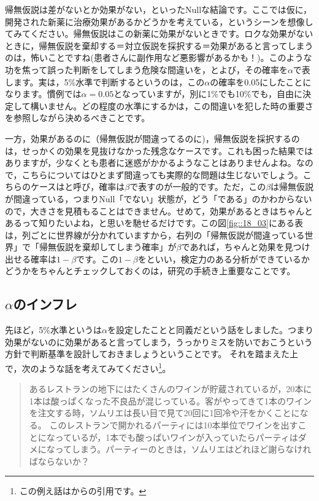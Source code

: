 \documentclass{ltjsarticle}
\begin{document}
帰無仮説は差がないとか効果がない，といったNullな結論です。ここでは仮に，開発された新薬に治療効果があるかどうかを考えている，というシーンを想像してみてください。帰無仮説はこの新薬に効果がないときです。ロクな効果がないときに，帰無仮説を棄却する＝対立仮説を採択する＝効果があると言ってしまうのは，怖いことですね(患者さんに副作用など悪影響があるかも！)。このような功を焦って誤った判断をしてしまう危険な間違いを，とよび，その確率を$\alpha$で表します。実は，5\%水準で判断するというのは，この$\alpha$の確率を0.05にしたことになります。慣例では$\alpha=0.05$となっていますが，別に1\%でも10\%でも，自由に決定して構いません。どの程度の水準にするかは，この間違いを犯した時の重要さを参照しながら決めるべきことです。

一方，効果があるのに（帰無仮説が間違ってるのに)，帰無仮説を採択するのは，せっかくの効果を見抜けなかった残念なケースです。これも困った結果ではありますが，少なくとも患者に迷惑がかかるようなことはありませんよね。なので，こちらについてはひとまず間違っても実際的な問題は生じないでしょう。こちらのケースはと呼び，確率は$\beta$で表すのが一般的です。ただ，この$\beta$は帰無仮説が間違っている，つまりNull「でない」状態が，どう「である」のかわからないので，大きさを見積もることはできません。せめて，効果があるときはちゃんとあるって知りたいよね，と思いを馳せるだけです。この図\ref{fig::18_03}にある表は，列ごとに世界線が分かれていますから，右列の「帰無仮説が間違っている世界」で「帰無仮説を棄却してしまう確率」が$\beta$であれば，ちゃんと効果を見つけ出せる確率は$1-\beta$です。この$1-\beta$をといい，検定力のある分析ができているかどうかをちゃんとチェックしておくのは，研究の手続き上重要なことです。

\subsection{$\alpha$のインフレ}

先ほど，5\%水準というは$\alpha$を設定したことと同義だという話をしました。つまり効果がないのに効果があると言ってしまう，うっかりミスを防いでおこうという方針で判断基準を設計しておきましょうということです。
それを踏まえた上で，次のような話を考えてみてください\footnote{この例え話は\citet{BA33892274}からの引用です。}。
\begin{quote}
あるレストランの地下にはたくさんのワインが貯蔵されているが，20本に1本は酸っぱくなった不良品が混じっている。客がやってきて1本のワインを注文する時，ソムリエは長い目で見て20回に1回冷や汗をかくことになる。
このレストランで開かれるパーティには10本単位でワインを出すことになっているが，1本でも酸っぱいワインが入っていたらパーティはダメになってしまう。パーティーのときは，ソムリエはどれほど謝らなければならないか？
\end{quote}
\end{document}
